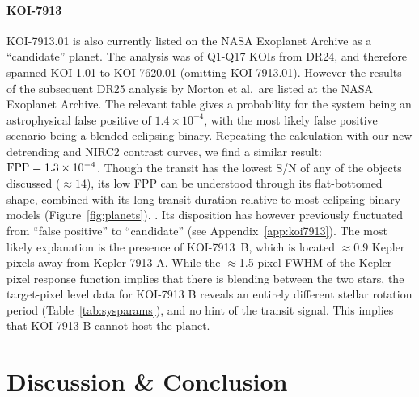 \documentclass[12pt,twocolumn,tighten,linenumbers]{aastex63}
\begin{document}
\paragraph{KOI-7913}
KOI-7913.01 is also currently listed on the NASA Exoplanet Archive as a
``candidate'' planet.  The \citet{morton_false_2016}
analysis was of Q1-Q17 KOIs from DR24, and therefore spanned KOI-1.01
to KOI-7620.01 (omitting KOI-7913.01).  However the results of the
subsequent DR25 analysis by Morton et al.\ are listed at the NASA
Exoplanet Archive.  The relevant table gives a probability for the
system being an astrophysical false positive of $1.4\times10^{-4}$,
with the most likely false positive scenario being a blended eclipsing
binary.  Repeating the calculation with our new detrending and
NIRC2 contrast curves, we find a similar result: ${\rm FPP} =
1.3\times10^{-4}$.  Though the transit has the lowest S/N of any of
the objects discussed ($\approx$$14$), its low FPP  can be understood through its flat-bottomed shape,
combined with its long transit duration relative to most
eclipsing binary models (Figure~\ref{fig:planets}).  .  Its
disposition has however previously fluctuated from ``false positive''
to ``candidate'' (see Appendix~\ref{app:koi7913}).  The most likely
explanation is the presence of KOI-7913~B, which is located
$\approx0.9$ Kepler pixels away from Kepler-7913 A.  
While the $\approx$1.5 pixel FWHM of the Kepler pixel response function
implies that there is blending between the two stars,
the target-pixel level data for KOI-7913 B reveals an
entirely different stellar rotation
period (Table~\ref{tab:sysparams}), and no hint of the transit signal.
This implies that KOI-7913 B cannot host the planet.


\section{Discussion \& Conclusion}
\label{sec:disc_conc}
\end{document}
